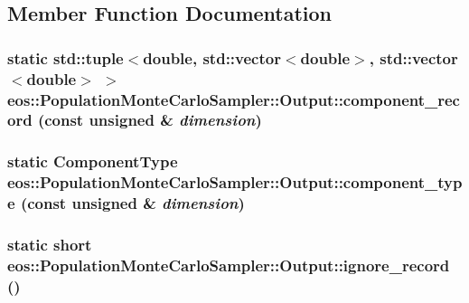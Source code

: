 \subsection{Member Function Documentation}
\hypertarget{structeos_1_1PopulationMonteCarloSampler_1_1Output_a55eed75bc734fdf74551769f1ef4f53a}{
\subsubsection[{component\_\-record}]{\setlength{\rightskip}{0pt plus 5cm}static std::tuple$<$double, std::vector$<$double$>$, std::vector$<$double$>$ $>$ eos::PopulationMonteCarloSampler::Output::component\_\-record (const unsigned \& {\em dimension})}}
\label{structeos_1_1PopulationMonteCarloSampler_1_1Output_a55eed75bc734fdf74551769f1ef4f53a}
\hypertarget{structeos_1_1PopulationMonteCarloSampler_1_1Output_a89756e43d911fc21ca5e12e4f676c495}{
\subsubsection[{component\_\-type}]{\setlength{\rightskip}{0pt plus 5cm}static {\bf ComponentType} eos::PopulationMonteCarloSampler::Output::component\_\-type (const unsigned \& {\em dimension})}}
\label{structeos_1_1PopulationMonteCarloSampler_1_1Output_a89756e43d911fc21ca5e12e4f676c495}
\hypertarget{structeos_1_1PopulationMonteCarloSampler_1_1Output_a0bc83ed4bd2ec948236eced9b6be6684}{
\subsubsection[{ignore\_\-record}]{\setlength{\rightskip}{0pt plus 5cm}static short eos::PopulationMonteCarloSampler::Output::ignore\_\-record ()}}

